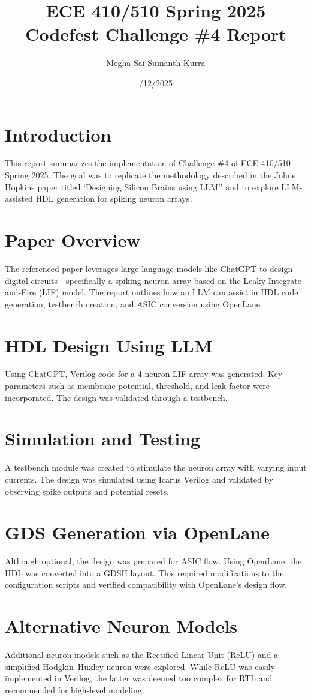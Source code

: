 \documentclass[12pt]{article}
\title{ECE 410/510 Spring 2025 \\ Codefest Challenge \#4 Report}
\author{Megha Sai Sumanth Kurra}
\date{\05/12/2025}
\begin{document}
\maketitle

\section{Introduction}
This report summarizes the implementation of Challenge \#4 of ECE 410/510 Spring 2025. 
The goal was to replicate the methodology described in the Johns Hopkins paper titled 
`Designing Silicon Brains using LLM'' and to explore LLM-assisted HDL generation for spiking neuron arrays'.

\section{Paper Overview}
The referenced paper leverages large language models like ChatGPT to design digital circuits---specifically 
a spiking neuron array based on the Leaky Integrate-and-Fire (LIF) model. The report outlines how an LLM 
can assist in HDL code generation, testbench creation, and ASIC conversion using OpenLane.

\section{HDL Design Using LLM}
Using ChatGPT, Verilog code for a 4-neuron LIF array was generated. Key parameters such as membrane 
potential, threshold, and leak factor were incorporated. The design was validated through a testbench.

\section{Simulation and Testing}
A testbench module was created to stimulate the neuron array with varying input currents. The design 
was simulated using Icarus Verilog and validated by observing spike outputs and potential resets.

\section{GDS Generation via OpenLane}
Although optional, the design was prepared for ASIC flow. Using OpenLane, the HDL was converted into a GDSII 
layout. This required modifications to the configuration scripts and verified compatibility with OpenLane's 
design flow.

\section{Alternative Neuron Models}
Additional neuron models such as the Rectified Linear Unit (ReLU) and a simplified Hodgkin--Huxley neuron were 
explored. While ReLU was easily implemented in Verilog, the latter was deemed too complex for RTL and recommended 
for high-level modeling.
\end{document}
